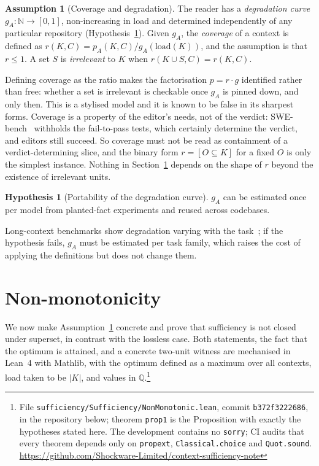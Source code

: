 \documentclass[10pt]{article}
\theoremstyle{definition}
\newtheorem{assumption}{Assumption}
\newtheorem{hypothesis}{Hypothesis}
\theoremstyle{plain}
\theoremstyle{remark}
\newcommand{\leanCommit}{b372f3222686}
\begin{document}
\begin{assumption}[Coverage and degradation]\label{as:factor}
The reader has a \emph{degradation curve} $g_A : \mathbb{N} \to [0,1]$, non-increasing in load and determined independently of any particular repository (Hypothesis~\ref{hyp:g}). Given $g_A$, the \emph{coverage} of a context is defined as $r(K, C) = p_A(K,C) / g_A(\mathrm{load}(K))$, and the assumption is that $r \leq 1$. A set $S$ is \emph{irrelevant} to $K$ when $r(K \cup S, C) = r(K, C)$.
\end{assumption}

Defining coverage as the ratio makes the factorisation $p = r\cdot g$ identified rather than free: whether a set is irrelevant is checkable once $g_A$ is pinned down, and only then. This is a stylised model and it is known to be false in its sharpest forms. Coverage is a property of the editor's needs, not of the verdict: SWE-bench~\cite{jimenez2023swebench} withholds the fail-to-pass tests, which certainly determine the verdict, and editors still succeed. So coverage must not be read as containment of a verdict-determining slice, and the binary form $r = [O \subseteq K]$ for a fixed $O$ is only the simplest instance. Nothing in Section~\ref{sec:nonmono} depends on the shape of $r$ beyond the existence of irrelevant units.

\begin{hypothesis}[Portability of the degradation curve]\label{hyp:g}
$g_A$ can be estimated once per model from planted-fact experiments and reused across codebases.
\end{hypothesis}

Long-context benchmarks show degradation varying with the task~\cite{hsieh2024ruler,levy2024same}; if the hypothesis fails, $g_A$ must be estimated per task family, which raises the cost of applying the definitions but does not change them.

\section{Non-monotonicity}\label{sec:nonmono}

We now make Assumption~\ref{as:factor} concrete and prove that sufficiency is not closed under superset, in contrast with the lossless case. Both statements, the fact that the optimum is attained, and a concrete two-unit witness are mechanised in Lean~4 with Mathlib, with the optimum defined as a maximum over all contexts, load taken to be $|K|$, and values in $\mathbb{Q}$.\footnote{File \texttt{sufficiency/Sufficiency/NonMonotonic.lean}, commit \texttt{\leanCommit}, in the repository below; theorem \texttt{prop1} is the Proposition with exactly the hypotheses stated here. The development contains no \texttt{sorry}; CI audits that every theorem depends only on \texttt{propext}, \texttt{Classical.choice} and \texttt{Quot.sound}.\\ \url{https://github.com/Shockware-Limited/context-sufficiency-note}}
\end{document}
